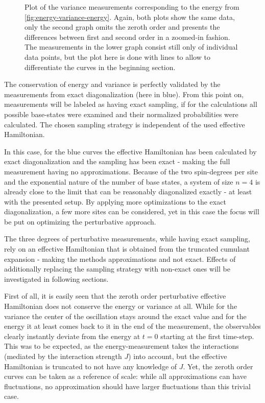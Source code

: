\begin{figure}[htbp]
    \centering
    \caption{
            Plot of the variance measurements corresponding to the energy from \autoref{fig:energy-variance-energy}.
            Again, both plots show the same data, only the second graph omits the zeroth order and presents the differences between first and second order in a zoomed-in fashion.
            The measurements in the lower graph consist still only of individual data points, but the plot here is done with lines to allow to differentiate the curves in the beginning section.
        }
    \label{fig:energy-variance-variance}
\end{figure}

The conservation of energy and variance is perfectly validated by the measurements from exact diagonalization (here in blue).
From this point on, measurements will be labeled as having \glqq exact sampling\grqq, if for the calculations all possible base-states were examined and their normalized probabilities were calculated.
The chosen sampling strategy is independent of the used effective Hamiltonian. 

In this case, for the blue curves the effective Hamiltonian has been calculated by exact diagonalization and the sampling has been exact - making the full measurement having no approximations.
Because of the two spin-degrees per site and the exponential nature of the number of base states, a system of size $n=4$ is already close to the limit that can be reasonably diagonalized exactly - at least with the presented setup.
By applying more optimizations to the exact diagonalization, a few more sites can be considered, yet in this case the focus will be put on optimizing the perturbative approach.

The three degrees of perturbative measurements, while having exact sampling, rely on an effective Hamiltonian that is obtained from the truncated cumulant expansion - making the methods approximations and not exact.
Effects of additionally replacing the sampling strategy with non-exact ones will be investigated in following sections.

First of all, it is easily seen that the zeroth order perturbative effective Hamiltonian does not conserve the energy or variance at all.
While for the variance the center of the oscillation stays around the exact value and for the energy it at least comes back to it in the end of the measurement, the observables clearly instantly deviate from the energy at $t=0$ starting at the first time-step.
This was to be expected, as the energy-measurement takes the interactions (mediated by the interaction strength $J$) into account, but the effective Hamiltonian is truncated to not have any knowledge of $J$.
Yet, the zeroth order curves can be taken as a reference of scale: while all approximations can have fluctuations, no approximation should have larger fluctuations than this trivial case.

